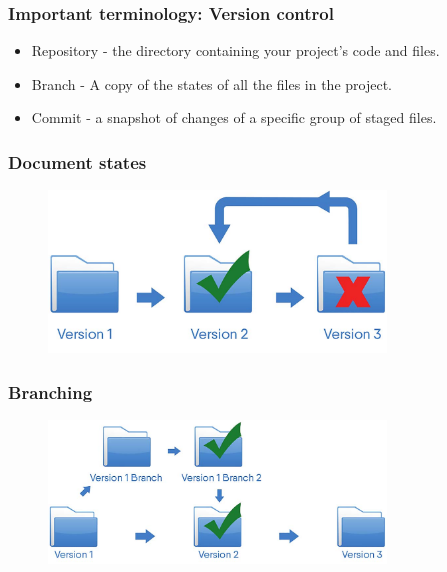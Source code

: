 \begin{frame}[t]
    \frametitle{Important terminology: Version control}
    
    \begin{itemize}
        \item Repository - the directory containing your project's code and files.
        \item Branch - A copy of the states of all the files in the project.
        \item Commit - a snapshot of changes of a specific group of staged files.
    \end{itemize}
\end{frame}

\begin{frame}
  \frametitle{Document states}
  \begin{figure}[htpb]
      \centering
      \includegraphics[width=0.8\textwidth]{images/singleton-vc.png}
  \end{figure}
\end{frame}

\begin{frame}
    \frametitle{Branching}
    \begin{figure}[htpb]
        \centering
        \includegraphics[width=0.8\textwidth]{images/branching-vc.png}
    \end{figure} 
\end{frame}


